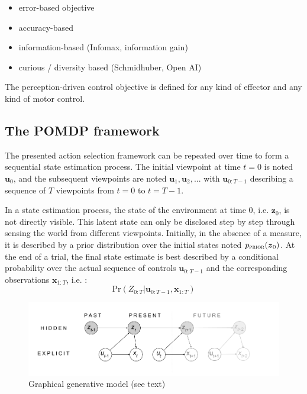 \documentclass[12pt,twoside,openright]{article}
\begin{document}
{\color{blue} 
	\begin{itemize}
		\item error-based objective
		\item accuracy-based
		\item information-based (Infomax, information gain)
		\item curious / diversity based  (Schmidhuber, Open AI)
	\end{itemize}
	
	
	The perception-driven control objective is defined for any kind of effector and any kind of motor control.} 

\subsection{The POMDP framework}

The presented action selection framework can be repeated over time to form a sequential state estimation process. 
The initial viewpoint at time $t=0$ is noted $\boldsymbol{u}_0$, and the subsequent viewpoints  are noted $\boldsymbol{u}_1, \boldsymbol{u}_2, ...$ with $\boldsymbol{u}_{0:T-1}$ describing a sequence of $T$ viewpoints from $t=0$ to $t=T-1$. %

In a state estimation process, the state of the environment at time 0, i.e. $\boldsymbol{z}_0$, is not directly visible. This latent state can only be disclosed step by step through sensing the world from different viewpoints. Initially, in the absence of a measure, it is described by a prior distribution over the initial states noted $p_\text{\sc prior}(\boldsymbol{z}_0)$. At the end of a trial, the final state estimate is best described by a conditional probability over the actual sequence of controls $\boldsymbol{u}_{0:T-1}$ and the corresponding observations $\boldsymbol{x}_{1:T}$, i.e. :
$$\text{Pr}(Z_{0:T}|\boldsymbol{u}_{0:T-1}, \boldsymbol{x}_{1:T})$$

\begin{figure}[t!]
	\centerline{
		\includegraphics[width = \linewidth]{img/ICLR-graphical-v2.png} 
	}
	\caption{Graphical generative model (see text)}\label{fig:pomdp}
\end{figure}
\end{document}
